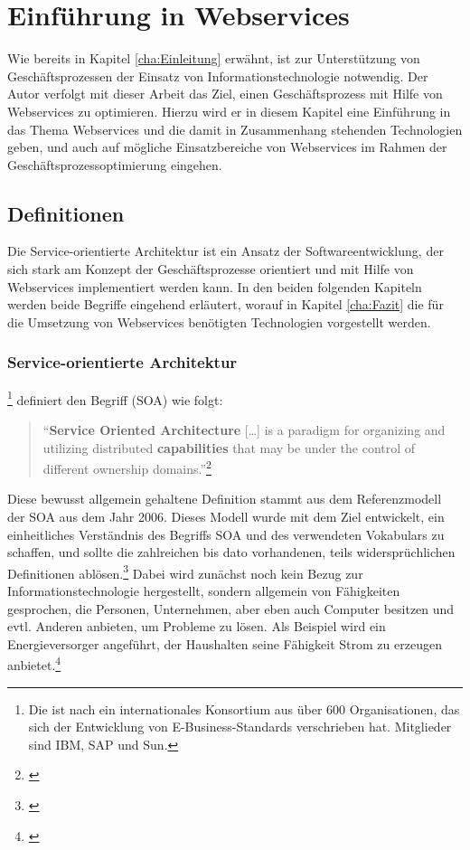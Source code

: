 \chapter{Einführung in Webservices}
\label{cha:EinführungInWebservices}
Wie bereits in Kapitel \ref{cha:Einleitung} erwähnt, ist zur Unterstützung von Geschäftsprozessen der Einsatz von Informationstechnologie notwendig. Der Autor verfolgt mit dieser Arbeit das Ziel, einen Geschäftsprozess mit Hilfe von Webservices zu optimieren. Hierzu wird er in diesem Kapitel eine Einführung in das Thema Webservices und die damit in Zusammenhang stehenden Technologien geben, und auch auf mögliche Einsatzbereiche von Webservices im Rahmen der Geschäftsprozessoptimierung eingehen.

\section{Definitionen}
\label{sec:DefinitionenWebservices}
Die Service-orientierte Architektur ist ein Ansatz der Softwareentwicklung, der sich stark am Konzept der Geschäftsprozesse orientiert und mit Hilfe von Webservices implementiert werden kann. In den beiden folgenden Kapiteln werden beide Begriffe eingehend erläutert, worauf in Kapitel \ref{cha:Fazit} die für die Umsetzung von Webservices benötigten Technologien vorgestellt werden.

\subsection{Service-orientierte Architektur}
\label{sec:DefinitionSOA}
\footnote{Die  ist nach \citep{OASIS2007} ein internationales Konsortium aus über 600 Organisationen, das sich der Entwicklung von E-Business-Standards verschrieben hat. Mitglieder sind \zB IBM, SAP und Sun.} definiert den Begriff  (SOA) wie folgt:
\begin{quote}
"`\textbf{Service Oriented Architecture} [\ldots] is a paradigm for organizing and utilizing distributed \textbf{capabilities} that may be under the control of different ownership domains."'\footnote{\citep[S.~8]{OASIS2006a}}
\end{quote}
Diese bewusst allgemein gehaltene Definition stammt aus dem Referenzmodell der SOA aus dem Jahr 2006. Dieses Modell wurde mit dem Ziel entwickelt, ein einheitliches Verständnis des Begriffs SOA und des verwendeten Vokabulars zu schaffen, und sollte die zahlreichen bis dato vorhandenen, teils widersprüchlichen Definitionen ablösen.\footnote{\vgl\citep[S.~4]{OASIS2006a}} Dabei wird zunächst noch kein Bezug zur Informationstechnologie hergestellt, sondern allgemein von Fähigkeiten gesprochen, die Personen, Unternehmen, aber eben auch Computer besitzen und evtl. Anderen anbieten, um Probleme zu lösen. Als Beispiel wird ein Energieversorger angeführt, der Haushalten seine Fähigkeit Strom zu erzeugen anbietet.\footnote{\vgl\citep[S.~8f.]{OASIS2006a}}

